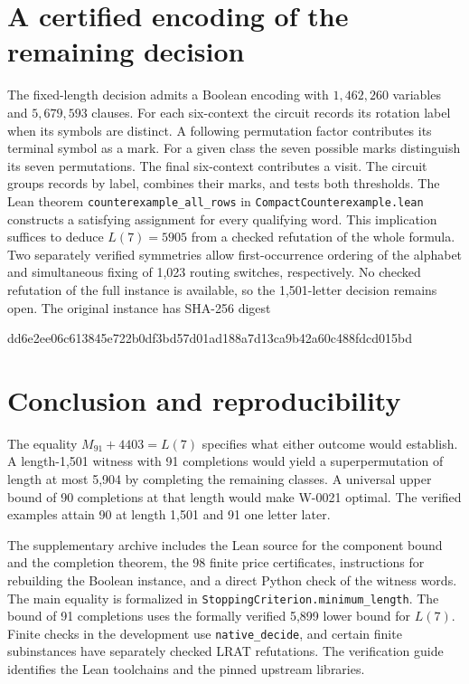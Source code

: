 \documentclass[11pt]{article}
\begin{document}
\section{A certified encoding of the remaining decision}\label{sec:sat}
The fixed-length decision admits a Boolean encoding with $1{,}462{,}260$
variables and $5{,}679{,}593$ clauses. For each six-context the circuit
records its rotation label when its symbols are distinct. A following
permutation factor contributes its terminal symbol as a mark. For a given
class the seven possible marks distinguish its seven permutations. The
final six-context contributes a visit. The circuit groups records by label,
combines their marks, and tests both thresholds. The Lean theorem
\texttt{counterexample\_all\_rows} in \texttt{CompactCounterexample.lean} constructs a satisfying assignment
for every qualifying word. This implication suffices to deduce $L(7)=5905$
from a checked refutation of the whole formula. Two separately verified
symmetries allow first-occurrence ordering of the alphabet and simultaneous
fixing of 1,023 routing switches, respectively. No checked refutation of the full instance is available, so the 1,501-letter decision remains open. The original instance has SHA-256 digest
\begin{center}\small\ttfamily
dd6e2ee06c613845e722b0df3bd57d01ad188a7d13ca9b42a60c488fdcd015bd
\end{center}



\section{Conclusion and reproducibility}
The equality $M_{91}+4403=L(7)$ specifies what either outcome would establish. A length-1,501 witness with 91 completions would yield a superpermutation of length at most 5,904 by completing the remaining classes. A universal upper bound of 90 completions at that length would make W-0021 optimal. The verified examples attain 90 at length 1,501 and 91 one letter later.

The supplementary archive includes the Lean source for the component bound and the completion theorem, the 98 finite price certificates, instructions for rebuilding the Boolean instance, and a direct Python check of the witness words. The main equality is formalized in \texttt{StoppingCriterion.minimum\_length}. The bound of 91 completions uses the formally verified 5,899 lower bound for $L(7)$. Finite checks in the development use \texttt{native\_decide}, and certain finite subinstances have separately checked LRAT refutations. The verification guide identifies the Lean toolchains and the pinned upstream libraries.
\end{document}
